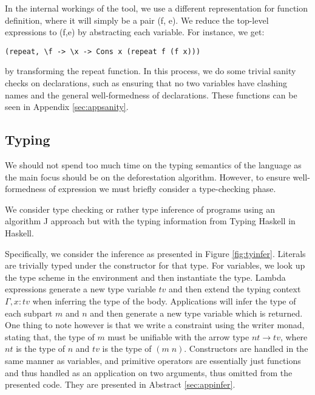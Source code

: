 \documentclass[a4paper, openany]{article}
\begin{document}
In the internal workings of the tool, we use a different representation for function definition, where it will simply be a pair (f, e).
We reduce the top-level expressions to (f,e) by abstracting each variable. For instance, we get:
\begin{lstlisting}
(repeat, \f -> \x -> Cons x (repeat f (f x)))
\end{lstlisting}

by transforming the repeat function.
In this process, we do some trivial sanity checks on declarations, such as
ensuring that no two variables have clashing names and the general well-formedness of declarations.
These functions can be seen in Appendix \ref{sec:appsanity}.

\subsection{Typing}
\label{sec:org84d9fa5}
We should not spend too much time on the typing semantics of the language as the main focus should be on the deforestation algorithm. However, to ensure well-formedness of expression we must briefly consider a type-checking phase.

We consider type checking or rather type inference of programs using an algorithm J approach\cite{milner} but with the typing information from Typing Haskell in Haskell\cite{thih}.

Specifically, we consider the inference as presented in Figure \ref{fig:tyinfer}.
Literals are trivially typed under the constructor for that type.
For variables, we look up the type scheme in the environment and then instantiate the type.
Lambda expressions generate a new type variable \(tv\) and then extend the typing context \(\Gamma, x : tv\) when inferring the type of the body.
Applications will infer the type of each subpart \(m\) and \(n\) and then generate a new type variable which is returned.
One thing to note however is that we write a constraint using the writer monad, stating that,
the type of \(m\) must be unifiable with the arrow type \(nt \rightarrow tv\), where \(nt\) is the type of \(n\) and \(tv\) is the type of \(( m \; n )\).
Constructors are handled in the same manner as variables, and primitive operators are essentially just functions and thus handled as an application on two arguments, thus omitted from the presented code. They are presented in Abstract \ref{sec:appinfer}.
\end{document}
